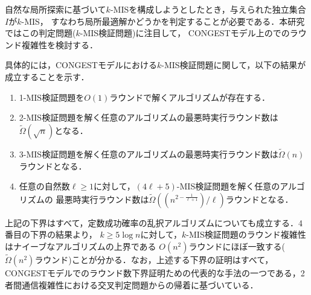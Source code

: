 \documentclass[12pt]{thesis}
\newcommand{\CONGEST}{\textsf{CONGEST}}
\theoremstyle{definition}
\begin{document}
自然な局所探索に基づいて$k$-MISを構成しようとしたとき，与えられた独立集合$I$が$k$-MIS，
すなわち局所最適解かどうかを判定することが必要である．本研究ではこの判定問題($k$-MIS検証問題)に注目して，
{\CONGEST}モデル上のでのラウンド複雑性を検討する．

具体的には，{\CONGEST}モデルにおける$k$-MIS検証問題に関して，以下の結果が成立することを示す．
\begin{enumerate}
\item 1-MIS検証問題を$O(1)$ラウンドで解くアルゴリズムが存在する．
\item 2-MIS検証問題を解く任意のアルゴリズムの最悪時実行ラウンド数は$\tilde{\Omega} (\sqrt{n})$となる．
\item 3-MIS検証問題を解く任意のアルゴリズムの最悪時実行ラウンド数は$\tilde{\Omega}(n)$ラウンドとなる．
\item 任意の自然数$\ell \geq 1$に対して，$(4\ell + 5)$-MIS検証問題を解く任意のアルゴリズムの
最悪時実行ラウンド数は$\tilde{\Omega}\left((n^{2 - \frac{1}{\ell+1}})/\ell\right)$ラウンドとなる．
\end{enumerate}

上記の下界はすべて，定数成功確率の乱択アルゴリズムについても成立する．4番目の下界の結果より，
$k\geq 5\log n$に対して，$k$-MIS検証問題のラウンド複雑性はナイーブなアルゴリズムの上界である
$O(n^2)$ラウンドにほぼ一致する($\tilde{\Omega}(n^2)$ラウンド)ことが分かる．なお，上述する下界の証明はすべて，
{\CONGEST}モデルでのラウンド数下界証明ための代表的な手法の一つである，2者間通信複雑性における交叉判定問題からの帰着に基づいている．
\end{document}
